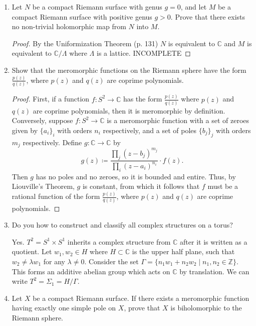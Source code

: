 \documentclass[11pt,oneside,english]{amsart}
\theoremstyle{definition}
\newcommand{\MB}[1]{\mathbb{#1}}
\begin{document}
\begin{enumerate}[leftmargin=*]
\begin{proof}
Additionally, $\tilde M$ is closed by continuity of $|f|$, so $\tilde M$ is both open and closed. Since $M$ is a Riemann surface, it is connected and thus $M=\tilde M$, i.e. $f$ is constant on $M$.
\end{proof}


\item Let $N$ be a compact Riemann surface with genus $g=0$, and let $M$ be a compact Riemann surface with positive genus $g>0$. Prove that there exists no non-trivial holomorphic map from $N$ into $M$.

\begin{proof}
By the Uniformization Theorem (p. 131) $N$ is equivalent to $\MB{C}$ and $M$ is equivalent to $\MB{C}/\Lambda$ where $\Lambda$ is a lattice. INCOMPLETE
\end{proof}

\item Show that the meromorphic functions on the Riemann sphere have the form $\frac{p(z)}{q(z)}$, where $p(z)$ and $q(z)$ are coprime polynomials.

\begin{proof}
First, if a function $f:S^2\to\MB{C}$ has the form $\frac{p(z)}{q(z)}$ where $p(z)$ and $q(z)$ are coprime polynomials, then it is meromorphic by definition. Conversely, suppose $f:S^2\to\MB{C}$ is a meromorphic function with a set of zeroes given by $\{a_i\}_i$ with orders $n_i$ respectively, and a set of poles $\{b_j\}_j$ with orders $m_j$ respectively. Define $g:\MB{C}\to\MB{C}$ by
\[
g(z)\coloneqq\frac{\prod_j(z-b_j)^{m_j}}{\prod_i (z-a_i)^{n_i}}\cdot f(z).
\]
Then $g$ has no poles and no zeroes, so it is bounded and entire. Thus, by Liouville's Theorem, $g$ is constant, from which it follows that $f$ must be a rational function of the form $\frac{p(z)}{q(z)}$, where $p(z)$ and $q(z)$ are coprime polynomials.
\end{proof}


\item Do you how to construct and classify all complex structures on a torus?

Yes. $T^2=S^1\times S^1$ inherits a complex structure from $\MB{C}$ after it is written as a quotient. Let $w_1,w_2\in H$ where $H\subset \MB{C}$ is the upper half plane, such that $w_2\neq \lambda w_1$ for any $\lambda\neq 0$. Consider the set $\Gamma=\{n_1w_1+n_2w_2\mid n_1,n_2\in\MB{Z}\}$. This forms an additive abelian group which acts on $\MB{C}$ by translation. We can write $T^2=\Sigma_1=H/\Gamma$.

\item Let $X$ be a compact Riemann surface. If there exists a meromorphic function having exactly one simple pole on $X$, prove that $X$ is biholomorphic to the Riemann sphere.


\end{enumerate}
\end{document}
